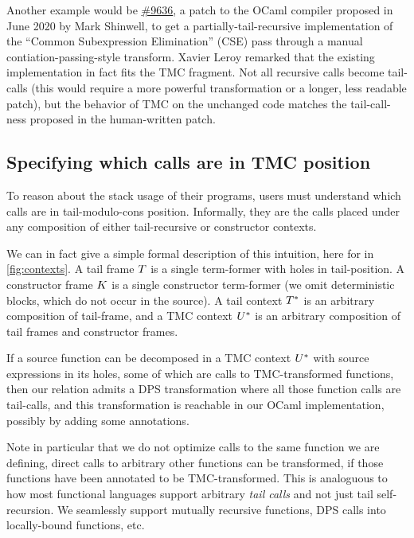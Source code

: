 Another example would be
\href{https://github.com/ocaml/ocaml/pull/9636}{\#9636}, a patch to
the OCaml compiler proposed in June 2020 by Mark Shinwell, to get
a partially-tail-recursive implementation of the ``Common
Subexpression Elimination'' (CSE) pass through a manual
contiation-passing-style transform. Xavier Leroy remarked that the
existing implementation in fact fits the TMC fragment. Not all
recursive calls become tail-calls (this would require a more powerful
transformation or a longer, less readable patch), but the behavior of
TMC on the unchanged code matches the tail-call-ness proposed in the
human-written patch.

\subsection{Specifying which calls are in TMC position} \label{subsec:specification}
To reason about the stack usage of their programs, users must understand which calls are in tail-modulo-cons position.
Informally, they are the calls placed under any composition of either tail-recursive or constructor contexts.

We can in fact give a simple formal description of this intuition, here for \DataLang in \cref{fig:contexts}.
A tail frame $\datalangTailFrame$ is a single term-former with holes in tail-position.
A constructor frame $\datalangConsFrame$ is a single constructor term-former (we omit deterministic blocks, which do not occur in the source).
A tail context $\datalangTailCtx$ is an arbitrary composition of tail-frame, and a TMC context $\datalangTMCCtx$ is an arbitrary composition of tail frames and constructor frames.

If a source function can be decomposed in a TMC context $\datalangTMCCtx$ with source expressions in its holes, some of which are calls to TMC-transformed functions, then our relation admits a DPS transformation where all those function calls are tail-calls, and this transformation is reachable in our OCaml implementation, possibly by adding some annotations.

Note in particular that we do not optimize calls to the same function we are defining, direct calls to arbitrary other functions can be transformed, if those functions have been annotated to be TMC-transformed.
This is analoguous to how most functional languages support arbitrary \emph{tail calls} and not just tail self-recursion.
We seamlessly support mutually recursive functions, DPS calls into locally-bound functions, etc.

